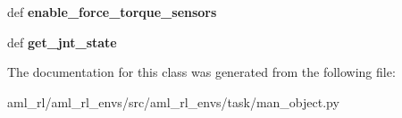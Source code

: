 \begin{DoxyCompactItemize}
\item 
\hypertarget{classaml__rl__envs_1_1task_1_1man__object_1_1_man_object_a02dfb80f09fac8f4f1006f77deb2fa27}{def {\bfseries enable\-\_\-force\-\_\-torque\-\_\-sensors}}\label{classaml__rl__envs_1_1task_1_1man__object_1_1_man_object_a02dfb80f09fac8f4f1006f77deb2fa27}

\item 
\hypertarget{classaml__rl__envs_1_1task_1_1man__object_1_1_man_object_af3984155a26348618b155dc7fe482549}{def {\bfseries get\-\_\-jnt\-\_\-state}}\label{classaml__rl__envs_1_1task_1_1man__object_1_1_man_object_af3984155a26348618b155dc7fe482549}

\end{DoxyCompactItemize}


The documentation for this class was generated from the following file\-:\begin{DoxyCompactItemize}
\item 
aml\-\_\-rl/aml\-\_\-rl\-\_\-envs/src/aml\-\_\-rl\-\_\-envs/task/man\-\_\-object.\-py\end{DoxyCompactItemize}
